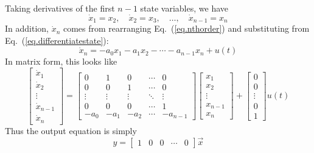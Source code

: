 \par
Taking derivatives of the first $n-1$ state variables, we have
\begin{equation}
    \dot{x}_1 = x_2, \quad \dot{x}_2 = x_3, \quad
        \ldots, \quad \dot{x}_{n-1} = x_n
    \label{eq.dotstatechain}
\end{equation}
In addition, $\dot{x}_n$ comes from rearranging Eq.~(\ref{eq.nthorder}) and substituting from Eq.~(\ref{eq.differentiatestate}):
\begin{equation}
    \dot{x}_n = -a_0x_1 - a_1x_2 -\cdots-a_{n-1}x_n + u(t)
    \label{eq.dotstatesub}
\end{equation}
In matrix form, this looks like
\begin{equation}
    \left[ \begin{array}{c} \dot{x}_1 \\ \dot{x}_2 \\ \vdots \\
                    \dot{x}_{n-1} \\ \dot{x}_n \end{array} \right]
    =
    \left[ \begin{array}{ccccc}
            0   &   1   &   0   &   \cdots  &   0   \\
            0   &   0   &   1   &   \cdots  &   0   \\
            \vdots&\vdots&\vdots&   \ddots  & \vdots\\
            0   &   0   &   0   &   \cdots  &   1   \\
            -a_0&   -a_1&   -a_2&   \cdots  &   -a_{n-1}
            \end{array} \right]
    \left[ \begin{array}{c} x_1 \\ x_2 \\ \vdots \\
                    x_{n-1} \\ x_n \end{array} \right]
    +
    \left[ \begin{array}{c} 0 \\ 0 \\ \vdots \\
                    0 \\ 1 \end{array} \right] u(t)
\end{equation}
Thus the output equation is simply
\begin{equation}
    y = \left[ \begin{array}{ccccc}1&0&0&\cdots&0\end{array} \right] \vec{x}
\end{equation}
